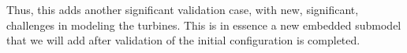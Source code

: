 %
%
%


%
%
Thus, this adds another significant validation case, with new, significant,
challenges in modeling the turbines. This is in essence a new embedded
submodel that we will add after validation of the initial configuration
is completed. 
